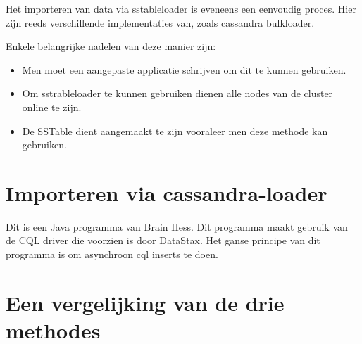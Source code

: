 Het importeren van data via sstableloader is eveneens een eenvoudig proces.
Hier zijn reeds verschillende implementaties van, zoals cassandra bulkloader.

Enkele belangrijke nadelen van deze manier zijn:
\begin{itemize}
	\item Men moet een aangepaste applicatie schrijven om dit te kunnen gebruiken.
	\item Om sstrableloader te kunnen gebruiken dienen alle nodes van de cluster online te zijn.
	\item De SSTable dient aangemaakt te zijn vooraleer men deze methode kan gebruiken.
\end{itemize}

\section{Importeren via cassandra-loader}
Dit is een Java programma van Brain Hess.
Dit programma maakt gebruik van de CQL driver die voorzien is door DataStax.
Het ganse principe van dit programma is om asynchroon cql inserts te doen.

\section{Een vergelijking van de drie methodes}
